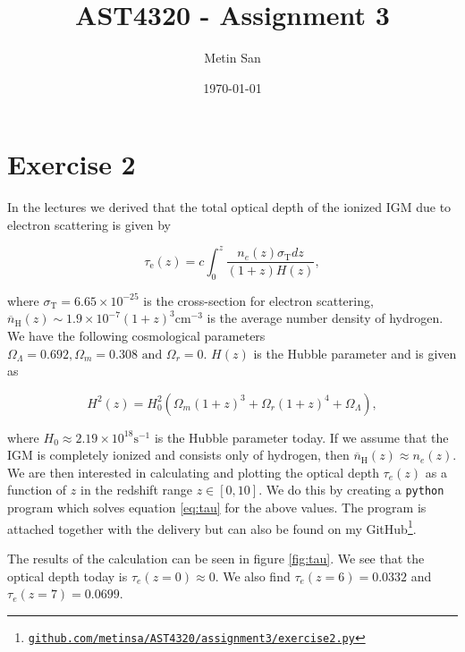 \documentclass[a4paper]{article}
\title{AST4320 - Assignment 3}
\author{Metin San}
\date{\today}
\begin{document}
\maketitle


\section*{Exercise 2}
In the lectures we derived that the total optical depth of the ionized IGM due to electron scattering is given by

\begin{equation}\label{eq:tau}
    \tau _ { \mathrm { e } } ( z ) = c \int _ { 0 } ^ { z } \frac { n _ { e } ( z ) \sigma _ { \mathrm { T } } d z } { ( 1 + z ) H ( z ) },
\end{equation}

\noindent where $\sigma _ { \mathrm { T } } = 6.65 \times 10^{-25}$ is the cross-section for electron scattering, $\overline { n } _ { \mathrm { H } } ( z ) \sim 1.9 \times 10 ^
{ - 7 } ( 1 + z ) ^ { 3 } \mathrm{cm}^{-3}$ is the average number density of hydrogen. We have the following cosmological parameters $\Omega _ { \Lambda } = 0.692 , 
\Omega _ { m } = 0.308 \text { and } \Omega _ { r } = 0$. $H(z)$ is the Hubble parameter and is given as

\begin{equation}\label{eq:hub}
    H ^ { 2 } ( z ) = H _ { 0 } ^ { 2 } \left( \Omega _ { m } ( 1 + z ) ^ { 3 } + \Omega _ { r } ( 1 + z ) ^ { 4 } + \Omega _ { \Lambda } \right),
\end{equation}

\noindent where $H_0 \approx 2.19\times 10^{18} \mathrm{s}^{-1}$ is the Hubble parameter today. If we assume that the IGM is completely ionized and consists only of hydrogen,
then $\overline { n } _ { \mathrm { H } } ( z ) \approx n_e(z)$. We are then interested in calculating and plotting the optical depth $\tau_e(z)$ as a function of $z$ in the redshift range $z\in [0,10]$. We do this by creating a \texttt{python} program which solves equation \eqref{eq:tau} for the above values. The program is attached together with the delivery but can also be found on my GitHub\footnote{\href{https://github.com/MetinSa/AST4320/blob/master/Assignment3/Exercise2.py}{\texttt{github.com/metinsa/AST4320/assignment3/exercise2.py}}}. 

The results of the calculation can be seen in figure \ref{fig:tau}. We see that the optical depth today is $\tau_e(z = 0)\approx 0$. We also find $\tau_e(z = 6) = 0.0332$ and $\tau_e(z = 7) = 0.0699$.
\end{document}
